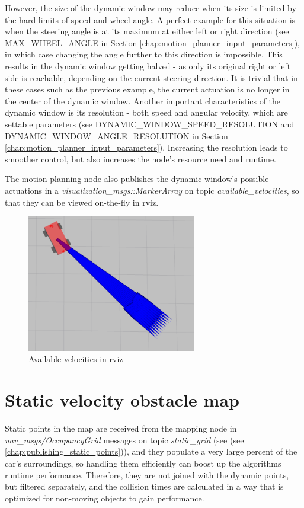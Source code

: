However, the size of the dynamic window may reduce when its size is limited by the hard limits of speed and wheel angle. A perfect example for this situation is when the steering angle is at its maximum at either left or right direction (see MAX\_WHEEL\_ANGLE in Section \ref{chap:motion_planner_input_parameters}), in which case changing the angle further to this direction is impossible. This results in the dynamic window getting halved - as only its original right or left side is reachable, depending on the current steering direction. It is trivial that in these cases such as the previous example, the current actuation is no longer in the center of the dynamic window.
Another important characteristics of the dynamic window is its resolution - both speed and angular velocity, which are settable parameters (see DYNAMIC\_WINDOW\_SPEED\_RESOLUTION and DYNAMIC\_WINDOW\_ANGLE\_RESOLUTION in Section \ref{chap:motion_planner_input_parameters}). Increasing the resolution leads to smoother control, but also increases the node's resource need and runtime.

The motion planning node also publishes the dynamic window's possible actuations in a \textit{visualization\_msgs::MarkerArray} \cite{ros_msg_MarkerArray} on topic \textit{available\_velocities}, so that they can be viewed on-the-fly in rviz.

\begin{figure}[!ht]
    \centering
    \includegraphics[height=60mm]{figures/raw/rviz_available_velocities.png}
    \caption{Available velocities in rviz}
    \label{rviz_available_velocities}
\end{figure}

\section{Static velocity obstacle map}
\label{chap:static_velocity_obstacle_map}
Static points in the map are received from the mapping node in \textit{nav\_msgs/OccupancyGrid} \cite{ros_msg_OccupancyGrid} messages on topic \textit{static\_grid} (see (see \ref{chap:publishing_static_points})), and they populate a very large percent of the car's surroundings, so handling them efficiently can boost up the algorithms runtime performance. Therefore, they are not joined with the dynamic points, but filtered separately, and the collision times are calculated in a way that is optimized for non-moving objects to gain performance.

